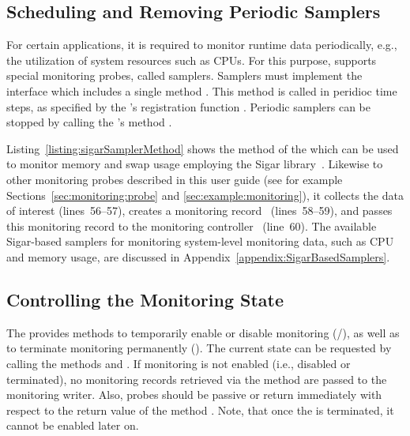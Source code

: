 \subsection{Scheduling and Removing Periodic Samplers}\label{sec:componentsMonitoring:monitoringController:periodicSamplers}

For certain applications, it is required to monitor runtime data periodically, %
e.g., the utilization of system resources such as CPUs. %
For this purpose, \Kieker{} supports special monitoring probes, called samplers. %
Samplers must implement the interface  which includes a %
single method . %
This method is called in peridioc time steps, %
as specified by the 's registration function %
. Periodic samplers can be stopped by %
calling the 's method .

Listing~\ref{listing:sigarSamplerMethod} shows the  method %
of the  which can be used to monitor memory %
and swap usage employing the Sigar library~\cite{HypericSigarWebsite}. %
Likewise to other monitoring probes described in this user guide (see for %
example Sections~\ref{sec:monitoring:probe} and \ref{sec:example:monitoring}), 
it collects the data of interest (lines~56--57), creates a monitoring record~%
(lines~58--59), and passes this monitoring record to the monitoring controller~%
(line~60). %
The available Sigar-based samplers for monitoring system-level monitoring %
data, such as CPU and memory usage, are discussed in Appendix~\ref{appendix:SigarBasedSamplers}. %

\pagebreak

\setJavaCodeListing


\subsection{Controlling the Monitoring State}\label{sec:componentsMonitoring:monitoringController:controState}

The  provides methods to temporarily enable or disable monitoring %
(/), as well as to terminate monitoring %
permanently (). %
The current state can be requested by calling the methods  %
and . If monitoring is not enabled (i.e., disabled %
or terminated), no monitoring records retrieved via the method  %
are passed to the monitoring writer. Also, probes should be passive or return immediately %
with respect to the return value of the method . %
Note, that once the  is terminated, it cannot be enabled %
later on. 


